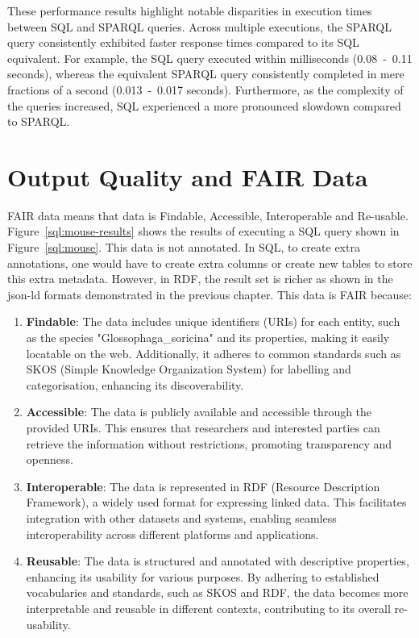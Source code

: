 These performance results highlight notable disparities in execution times between SQL and SPARQL queries.  Across multiple executions, the SPARQL query consistently exhibited faster response times compared to its SQL equivalent.  For example, the SQL query executed within milliseconds (0.08~-~0.11 seconds), whereas the equivalent SPARQL query consistently completed in mere fractions of a second (0.013~-~0.017 seconds).  Furthermore, as the complexity of the queries increased, SQL experienced a more pronounced slowdown compared to SPARQL\@.

\section{Output Quality and FAIR Data}

FAIR data means that data is Findable, Accessible, Interoperable and Re-usable.  Figure~\ref{sql:mouse-results} shows the results of executing a SQL query shown in Figure~\ref{sql:mouse}.  This data is not annotated.  In SQL, to create extra annotations, one would have to create extra columns or create new tables to store this extra metadata.  However, in RDF, the result set is richer as shown in the json-ld formats demonstrated in the previous chapter.  This data is FAIR because:

\begin{enumerate}
\item \textbf{Findable}: The data includes unique identifiers (URIs) for each entity, such as the species "Glossophaga\_soricina" and its properties, making it easily locatable on the web. Additionally, it adheres to common standards such as SKOS (Simple Knowledge Organization System) for labelling and categorisation, enhancing its discoverability.
\item \textbf{Accessible}: The data is publicly available and accessible through the provided URIs. This ensures that researchers and interested parties can retrieve the information without restrictions, promoting transparency and openness.
\item \textbf{Interoperable}: The data is represented in RDF (Resource Description Framework), a widely used format for expressing linked data. This facilitates integration with other datasets and systems, enabling seamless interoperability across different platforms and applications.
\item \textbf{Reusable}: The data is structured and annotated with descriptive properties, enhancing its usability for various purposes. By adhering to established vocabularies and standards, such as SKOS and RDF, the data becomes more interpretable and reusable in different contexts, contributing to its overall re-usability.
\end{enumerate}


